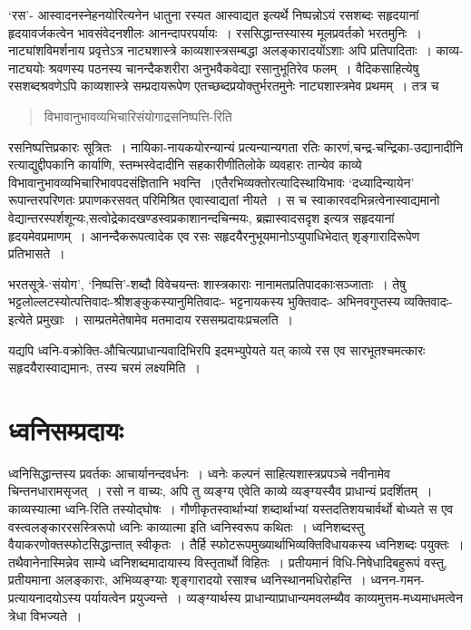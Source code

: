 {‘रस’- आस्वादनस्नेहनयोरित्यनेन धातुना रस्यत आस्वाद्यत इत्यर्थे निष्पन्नोऽयं रसशब्दः सहृदयानां हृदयावर्जकत्वेन भावसंवेदनशीलः आनन्दापरपर्यायः~। रससिद्धान्तस्यास्य मूलप्रवर्तको भरतमुनिः~। नाट्यांशविमर्शनाय प्रवृत्तेऽत्र नाट्यशास्त्रे काव्यशास्त्रसम्बद्धा अलङ्कारादयोंऽशाः अपि प्रतिपादिताः~। काव्य-नाट्ययोः श्रवणस्य पठनस्य चानन्दैकशरीरा अनुभवैकवेद्या रसानुभूतिरेव फलम्~। वैदिकसाहित्येषु रसशब्दश्रवणेऽपि काव्यशास्त्रे सम्प्रदायरूपेण एतच्छब्दप्रयोक्तुर्भरतमुनेः नाट्यशास्त्रमेव प्रथमम्~। तत्र च 

\begin{verse}
विभावानुभावव्यभिचारिसंयोगाद्रसनिष्पत्ति-रिति 
\end{verse}

रसनिष्पत्तिप्रकारः सूत्रितः~। नायिका-नायकयोरन्यान्यं प्रत्यन्यान्यगता रतिः कारणं,\break चन्द्र-चन्द्रिका-उद्यानादीनि रत्याद्युद्दीपकानि कार्याणि, स्तम्भस्वेदादीनि सहकारीणीति\break लोके व्यवहारः तान्येव काव्ये विभावानुभावव्यभिचारिभावपदसंज्ञितानि भवन्ति~।\break  एतैरभिव्यक्तोरत्यादिस्थायिभावः ‘दध्यादिन्यायेन’ रूपान्तरपरिणतः प्रपाणकरसवत् परिमि\-श्रित एवास्वाद्यतां नीयते~। स च स्वाकारवदभिन्नत्वेनास्वाद्यमानो वेद्यान्तरस्पर्शशून्यः,\break सत्वोद्रेकादखण्डस्वप्रकाशानन्दचिन्मयः, ब्रह्मास्वादसदृश इत्यत्र सहृदयानां हृदयमेव\break प्रमाणम्~। आनन्दैकरूपत्वादेक एव रसः सहृदयैरनुभूयमानोऽप्युपाधिभेदात् शृङ्गारादिरूपेण प्रतिभासते~। 
 
भरतसूत्रे-‘संयोग’, ‘निष्पत्ति’-शब्दौ विवेचयन्तः शास्त्रकाराः नानामतप्रतिपादकाः\break सञ्जाताः~। तेषु भट्टलोल्लटस्योत्पत्तिवादः-श्रीशङ्कुकस्यानुमितिवादः- भट्टनायकस्य भुक्तिवादः- अभिनवगुप्तस्य व्यक्तिवादः-इत्येते प्रमुखाः~। साम्प्रतमेतेषामेव मतमादाय रससम्प्रदायः\break प्रचलति~। 

यद्यपि ध्वनि-वक्रोक्ति-औचित्यप्राधान्यवादिभिरपि इदमभ्युपेयते यत् काव्ये रस एव सारभूतश्चमत्कारः सहृदयैरास्वाद्यमानः, तस्य चरमं लक्ष्यमिति~। 

\section*{ ध्वनिसम्प्रदायः}

ध्वनिसिद्धान्तस्य प्रवर्तकः आचार्यानन्दवर्धनः~। ध्वनेः कल्पनं साहित्यशास्त्रप्रपञ्चे नवीनामेव चिन्तनधारामसृजत्~। रसो न वाच्यः, अपि तु व्यङ्ग्य एवेति काव्ये व्यङ्ग्यस्यैव प्राधान्यं प्रदर्शितम्~।काव्यस्यात्मा ध्वनि-रिति तस्योद्घोषः~। गौणीकृतस्वार्थाभ्यां शब्दार्थाभ्यां यस्तदतिशयचार्वर्थो बोध्यते स एव वस्त्वलङ्काररसस्त्रिरूपो ध्वनिः काव्यात्मा इति ध्वनिस्वरूप कथितः~। ध्वनिशब्दस्तु वैयाकरणोक्तस्फोटसिद्धान्तात् स्वीकृतः~। तैर्हि स्फोटरूपमुख्यार्थाभिव्यक्तिविधायकस्य ध्वनिशब्दः पयुक्तः~। तथैवानेनास्मिन्नेव साम्ये ध्वनिशब्दमादायास्य विस्तृतार्थो विहितः~। प्रतीयमानं विधि-निषेधादिबहुरूपं वस्तु, प्रतीयमाना अलङ्काराः, अभिव्यङ्ग्याः शृङ्गारादयो रसाश्च ध्वनिस्थानमधिरोहन्ति~। ध्वनन-गमन-प्रत्यायनादयोऽस्य पर्यायत्वेन प्रयुज्यन्ते~। व्यङ्ग्यार्थस्य प्राधान्याप्राधान्यमवलम्ब्यैव काव्यमुत्तम-मध्यमाधमत्वेन त्रेधा विभज्यते~। 

}
